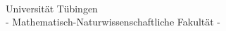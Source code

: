 


%


\thispagestyle{empty}



\begin{verbatim}


\end{verbatim}

\begin{center}
\Large{Universität Tübingen}\\
\Large{- Mathematisch-Naturwissenschaftliche Fakultät -}\\
\end{center}


